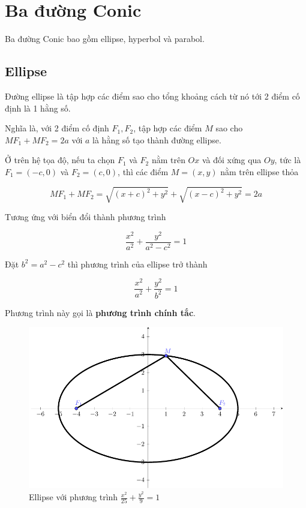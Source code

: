 \chapter{Ba đường Conic}

Ba đường Conic bao gồm ellipse, hyperbol và parabol.

\section{Ellipse}

\begin{definition}[Ellipse]
    Đường ellipse là tập hợp các điểm sao cho tổng khoảng cách từ nó tới 2 điểm cố định là 1 hằng số.
\end{definition}

Nghĩa là, với 2 điểm cố định $F_1, F_2$, tập hợp các điểm $M$ sao cho $M F_1 + M F_2 = 2a$ với $a$ là hằng số tạo thành đường ellipse.

Ở trên hệ tọa độ, nếu ta chọn $F_1$ và $F_2$ nằm trên $Ox$ và đối xứng qua $Oy$, tức là $F_1 = (-c, 0)$ và $F_2 = (c, 0)$, thì các điểm $M = (x, y)$ nằm trên ellipse thỏa

$$MF_1 + MF_2 = \sqrt{(x+c)^2 + y^2} + \sqrt{(x-c)^2 + y^2} = 2a$$

Tương ứng với biển đổi thành phương trình

$$\frac{x^2}{a^2} + \frac{y^2}{a^2 - c^2} = 1$$

Đặt $b^2 = a^2 - c^2$ thì phương trình của ellipse trở thành

$$\frac{x^2}{a^2} + \frac{y^2}{b^2} = 1$$

Phương trình này gọi là \textbf{phương trình chính tắc}.

\begin{figure}[ht]
    \centering
    \includegraphics[width=\textwidth]{pics/conics/ellipse.pdf}
    \caption{Ellipse với phương trình $\frac{x^2}{25} + \frac{y^2}{9} = 1$}
\end{figure}

